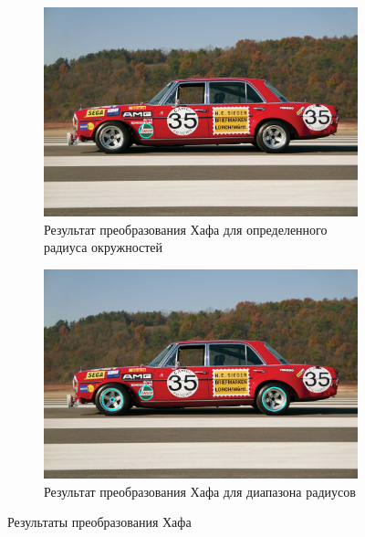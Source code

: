 \begin{figure}
    \centering
    \begin{subfigure}[b]{\textwidth}
        \centering
        \includegraphics[width=\textwidth]{images/circles/Mercedes_SP.jpg}
        \caption{Результат преобразования Хафа для определенного радиуса окружностей}
        \label{img:mer_sp}
    \end{subfigure}
    \hfill
    \begin{subfigure}[b]{\textwidth}
        \centering
        \includegraphics[width=\textwidth]{images/circles/Mercedes_R.jpg}
        \caption{Результат преобразования Хафа для диапазона радиусов}
        \label{img:mer_r}
    \end{subfigure}
        \caption{Результаты преобразования Хафа}
       \label{img::mer_comp}
\end{figure}

\clearpage